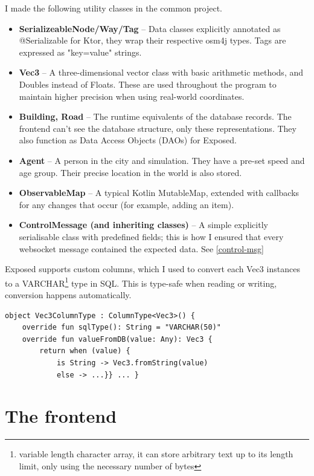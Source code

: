 I made the following utility classes in the common project. \begin{itemize}
    \item \textbf{SerializeableNode/Way/Tag} -- Data classes explicitly annotated as @Serializable for Ktor, they wrap their respective osm4j types. Tags are expressed as "key=value" strings.
    \item \textbf{Vec3} -- A three-dimensional vector class with basic arithmetic methods, and Doubles instead of Floats. These are used throughout the program to maintain higher precision when using real-world coordinates.
    \item \textbf{Building, Road} -- The runtime equivalents of the database records. The frontend can't see the database structure, only these representations. They also function as Data Access Objects (DAOs) for Exposed.
    \item \textbf{Agent} -- A person in the city and simulation. They have a pre-set speed and age group. Their precise location in the world is also stored.
    \item \textbf{ObservableMap} -- A typical Kotlin MutableMap, extended with callbacks for any changes that occur (for example, adding an item).
    \item \textbf{ControlMessage (and inheriting classes)} -- A simple explicitly serialisable class with predefined fields; this is how I ensured that every websocket message contained the expected data. See \ref{control-msg}
\end{itemize}

\label{serialise}
Exposed supports custom columns, which I used to convert each Vec3 instances to a VARCHAR\footnote{variable length character array, it can store arbitrary text up to its length limit, only using the necessary number of bytes} type in SQL. This is type-safe when reading or writing, conversion happens automatically.
\begin{lstlisting}[caption=Custom column type in JetBrains Exposed]
    object Vec3ColumnType : ColumnType<Vec3>() {
    override fun sqlType(): String = "VARCHAR(50)"
    override fun valueFromDB(value: Any): Vec3 {
        return when (value) {
            is String -> Vec3.fromString(value)
            else -> ...}} ... }
\end{lstlisting}

\section{The frontend}

